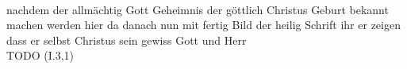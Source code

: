 \begin{exe}
\ex \label{ex:I728} \gll {}                                    \\
{nachdem} {der} {allmächtig} {Gott} {Geheimnis} {der} {göttlich} {Christus} {Geburt} {bekannt machen} {werden} {} {hier} {da} {danach} {nun} {mit} {fertig} {Bild} {der} {heilig} {Schrift} {ihr} {er} {zeigen} {} {dass} {er} {selbst} {Christus} {sein} {gewiss} {Gott} {und} {Herr} {}\\
\glt TODO (I.3,1)
\end{exe}
